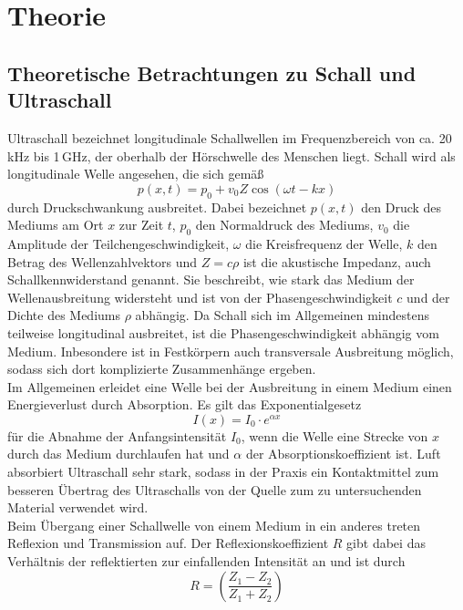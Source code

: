 \section{Theorie}
\label{sec:Theorie}
\subsection{Theoretische Betrachtungen zu Schall und Ultraschall}
\label{subsec:theorie1}
Ultraschall bezeichnet longitudinale Schallwellen im Frequenzbereich von ca.
20\,kHz bis 1\,GHz, der oberhalb der Hörschwelle des Menschen liegt.
Schall wird als longitudinale Welle angesehen, die sich gemäß
\begin{equation}
  p(x,t) = p_0 + v_0 Z \cos(\omega t - kx)
\end{equation}
durch Druckschwankung ausbreitet. Dabei bezeichnet $p(x,t)$ den Druck des Mediums
am Ort $x$ zur Zeit $t$, $p_0$ den Normaldruck des Mediums, $v_0$ die Amplitude der Teilchengeschwindigkeit,
$\omega$ die Kreisfrequenz der Welle, $k$ den Betrag des Wellenzahlvektors und $Z = c \rho$ ist die akustische
Impedanz, auch Schallkennwiderstand genannt. Sie beschreibt, wie stark das Medium
der Wellenausbreitung widersteht und ist von der Phasengeschwindigkeit $c$ und der
Dichte des Mediums $\rho$ abhängig. Da Schall sich im Allgemeinen mindestens teilweise
longitudinal ausbreitet, ist die Phasengeschwindigkeit abhängig vom Medium. Inbesondere
ist in Festkörpern auch transversale Ausbreitung möglich, sodass sich dort komplizierte Zusammenhänge
ergeben.\\
Im Allgemeinen erleidet eine Welle bei der Ausbreitung in einem Medium einen Energieverlust
durch Absorption. Es gilt das Exponentialgesetz
\begin{equation}
  I(x) = I_0 \cdot e^{\alpha x}
\end{equation}
für die Abnahme der Anfangsintensität $I_0$, wenn die Welle eine Strecke von $x$ durch
das Medium durchlaufen hat und $\alpha$ der Absorptionskoeffizient ist.
Luft absorbiert Ultraschall sehr stark, sodass in der Praxis ein Kontaktmittel
zum besseren Übertrag des Ultraschalls von der Quelle zum zu untersuchenden Material
verwendet wird.\\
Beim Übergang einer Schallwelle von einem Medium in ein anderes treten Reflexion und
Transmission auf. Der Reflexionskoeffizient $R$ gibt dabei das Verhältnis der reflektierten
zur einfallenden Intensität an und ist durch
\begin{equation}
R = \left( \frac{Z_1-Z_2}{Z_1+Z_2} \right)
\end{equation}

